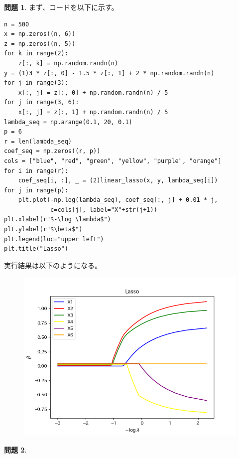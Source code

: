\documentclass[titlepage]{jsarticle}
\theoremstyle{definition}
\newtheorem{Ex}{問題}
\theoremstyle{mystyle} %
\renewcommand{\footnotesize}{\normalsize}
\begin{document}
\begin{Ex}
まず、コードを以下に示す。
\begin{lstlisting}[basicstyle = \ttfamily\footnotesize, frame = single]
n = 500
x = np.zeros((n, 6))
z = np.zeros((n, 5))
for k in range(2):
    z[:, k] = np.random.randn(n)
y = (1)3 * z[:, 0] - 1.5 * z[:, 1] + 2 * np.random.randn(n)
for j in range(3):
    x[:, j] = z[:, 0] + np.random.randn(n) / 5
for j in range(3, 6):
    x[:, j] = z[:, 1] + np.random.randn(n) / 5
lambda_seq = np.arange(0.1, 20, 0.1)
p = 6
r = len(lambda_seq)
coef_seq = np.zeros((r, p))
cols = ["blue", "red", "green", "yellow", "purple", "orange"]
for i in range(r):
    coef_seq[i, :], _ = (2)linear_lasso(x, y, lambda_seq[i])
for j in range(p):
    plt.plot(-np.log(lambda_seq), coef_seq[:, j] + 0.01 * j,
             c=cols[j], label="X"+str(j+1))
plt.xlabel(r"$-\log \lambda$")
plt.ylabel(r"$\beta$")
plt.legend(loc="upper left")
plt.title("Lasso")
\end{lstlisting}

実行結果は以下のようになる。

\begin{figure}[H]
\centering
\includegraphics[scale=0.6] {monndai17.png}
\end{figure}
\end{Ex}
\begin{Ex}

\end{Ex}
\end{document}
